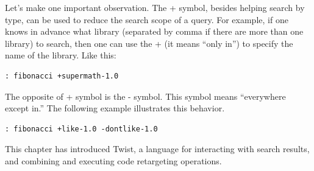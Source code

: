 Let's make one important observation. The + symbol, besides helping search by type, can be used to reduce the search scope of a query. For example, if one knows in advance what library (separated by comma if there are more than one library) to search, then one can use the + (it means ``only in'') to specify the name of the library. Like this:

\begin{verbatim}
: fibonacci +supermath-1.0 
\end{verbatim}

The opposite of + symbol is the - symbol. This symbol means ``everywhere except in.'' The following example illustrates this behavior.

\begin{verbatim}
: fibonacci +like-1.0 -dontlike-1.0
\end{verbatim}
 
 
This chapter has introduced Twist, a language for interacting with search results, and combining and executing code retargeting operations. 
